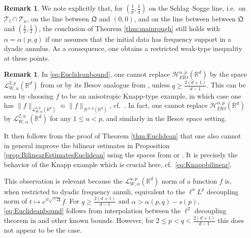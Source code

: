 \documentclass{amsart}
\numberwithin{equation}{section}
\theoremstyle{definition}
\newtheorem{remark}[theorem]{Remark}
\newcommand{\Rd}{\mathbb{R}^{d}}
\newcommand{\N}{\mathbb{N}}
\newcommand {\HT}{\mathcal{H}}
\begin{document}
\begin{remark}\label{rem:dyadicestimatesEuclidean}
We note explicitly %
that, for $(\frac{1}{p},\frac{1}{q})$ on the Schlag--Sogge line, i.e.~on $\mathcal{T}_{l}\cap \mathcal{T}_{u}$, on the line between $\mathfrak{Q}$ and $(0,0)$, and on the line between between $\mathfrak{Q}$ and $(\frac{1}{2},\frac{1}{2})$, %
the conclusion of Theorem \ref{thm:mainrough} still holds with $\alpha=\alpha(p,q)$ if one assumes that the initial data has frequency support in a dyadic annulus. %
As a consequence, one obtains a restricted weak-type inequality at these points. 
\end{remark}

\begin{remark}\label{rem:ell2decoupling}
In \eqref{eq:Euclideanbound}, one cannot replace $\HT^{\alpha,p}_{FIO}(\Rd)$ by the space $\mathcal{L}^{2,p}_{W,\alpha}(\Rd)$ from \cite{HaPoRoYu26} or by its Besov analogue from \cite{RozendaalSchippa2023}, unless $q\geq \frac{2(d+1)}{d-1}$. This can be seen by choosing $f$ to be an anisotropic Knapp-type example, in which case one has $\|f\|_{\mathcal{L}^{2,p}_{W,\alpha}(\Rd)}\eqsim \|f\|_{\HT^{\alpha,p}(\Rd)}$, cf.~\cite[Proposition 7.1]{HaPoRoYu26}. In fact, one cannot replace $\HT^{\alpha,p}_{FIO}(\Rd)$ by $\mathcal{L}^{2,u}_{W,\alpha}(\Rd)$ for any $1\leq u<p$, and similarly in the Besov space setting.

It then follows from the proof of Theorem \ref{thm:Euclidean} that one also cannot in general improve the bilinear estimates in Proposition \ref{prop:BilinearEstimatesEuclidean} using the spaces from \cite{HaPoRoYu26} or \cite{RozendaalSchippa2023}. It is precisely the behavior of the Knapp example which is crucial here, cf.~\eqref{eq:Knappbilinear}.

This observation is relevant because the $\mathcal{L}^{u,p}_{W,\alpha}(\Rd)$ norm of a function $f$ is, when restricted to dyadic frequency annuli, equivalent to the $\ell^{u}L^{p}$ decoupling norm of $t\mapsto e^{it\sqrt{-\Delta}}f$. For $q\geq \frac{2(d+1)}{d-1}$ and $\alpha>\alpha(p,q)-s(p)$, \eqref{eq:Euclideanbound} follows from interpolation between the $\ell^{2}$ decoupling theorem in \cite{BourgainDemeter2015} and other known bounds. However, for $2\leq p<q<\frac{2(d+1)}{d-1}$ this does not appear to be the case.
\end{remark}
\end{document}
